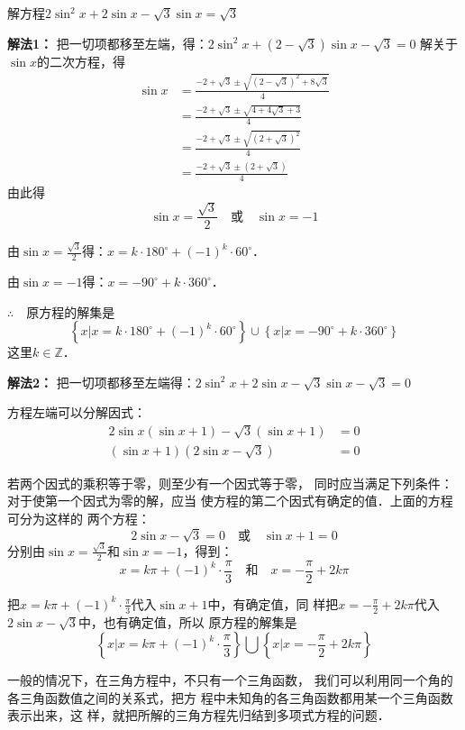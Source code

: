 \begin{example}
    解方程$2\sin^2x+2\sin x-\sqrt{3}\sin x=\sqrt{3}$
\end{example}

\begin{solution}
\textbf{解法1：} 把一切项都移至左端，得：$2\sin^2x+\left(2-\sqrt{3}\right)\sin x-\sqrt{3}=0$
解关于$\sin x$的二次方程，得
\[\begin{split}
\sin x&=\frac{-2+\sqrt{3}\pm \sqrt{\left(2-\sqrt{3}\right)^2+8\sqrt{3}}}{4}\\
&=\frac{-2+\sqrt{3}\pm \sqrt{4+4\sqrt{3}+3}}{4}\\
&=\frac{-2+\sqrt{3}\pm \sqrt{\left(2+\sqrt{3}\right)^2}}{4}\\
&=\frac{-2+\sqrt{3}\pm \left(2+\sqrt{3}\right)}{4}
\end{split}\]
由此得
\[\sin x=\frac{\sqrt{3}}{2}\quad \text{或}\quad \sin x=-1\]

由$\sin x=\frac{\sqrt{3}}{2}$得：$x=k\cdot 180^{\circ}+(-1)^k\cdot 60^{\circ}$．

由$\sin x=-1$得：$x=-90^{\circ}+k\cdot 360^{\circ}$．

$\therefore\quad $原方程的解集是
\[\left\{x|x=k\cdot 180^{\circ}+(-1)^k\cdot 60^{\circ}\right\}\cup \left\{x|x=-90^{\circ}+k\cdot 360^{\circ}\right\}\]
这里$k\in\mathbb{Z}$．

\textbf{解法2：} 把一切项都移至左端得：$2\sin^2x+2\sin x-\sqrt{3}\sin x-\sqrt{3}=0$

方程左端可以分解因式：
\[\begin{split}
    2\sin x(\sin x+1)-\sqrt{3}(\sin x+1)&=0\\
    (\sin x+1)\left(2\sin x-\sqrt{3}\right)&=0
\end{split}\]

若两个因式的乘积等于零，则至少有一个因式等于零，
同时应当满足下列条件：对于使第一个因式为零的解，应当
使方程的第二个因式有确定的值．上面的方程可分为这样的
两个方程：
\[2\sin x-\sqrt{3}=0\quad \text{或}\quad \sin x+1=0\]
分别由$\sin x=\frac{\sqrt{3}}{2} $和$\sin x=-1$，得到：
\[x=k\pi+(-1)^k \cdot\frac{\pi}{3}\quad \text{和}\quad x=-\frac{\pi}{2}+2k\pi\]

把$x=k\pi+(-1)^k \cdot\frac{\pi}{3}$代入$\sin x+1$中，有确定值，同
样把$x=-\frac{\pi}{2}+2k\pi$代入$2\sin x-\sqrt{3}$中，也有确定值，所以
原方程的解集是
\[\left\{x\Big|x=k\pi+(-1)^k \cdot\frac{\pi}{3}\right\}\bigcup \left\{x\Big|x=-\frac{\pi}{2}+2k\pi\right\}\]
\end{solution}

一般的情况下，在三角方程中，不只有一个三角函数，
我们可以利用同一个角的各三角函数值之间的关系式，把方
程中未知角的各三角函数都用某一个三角函数表示出来，这
样，就把所解的三角方程先归结到多项式方程的问题．

